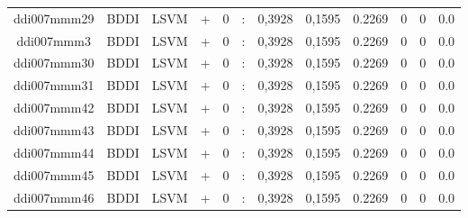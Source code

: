 \documentclass[a4paper]{article}
\begin{document}
\begin{landscape}
\begin{center}
\begin{tabular}{ |c|c|c|c|c|c|c|c|c|c|c|c|}
 	
 
 	
 		
 		\small{ ddi007mmm29 } & BDDI & LSVM & +  &  0 &  :  &  0,3928 & 0,1595 & 0.2269  &  0 & 0 & 0.0 \\
 		

 	
 
 	
 		
 		\small{ ddi007mmm3 } & BDDI & LSVM & +  &  0 &  :  &  0,3928 & 0,1595 & 0.2269  &  0 & 0 & 0.0 \\
 		

 	
 
 	
 		
 		\small{ ddi007mmm30 } & BDDI & LSVM & +  &  0 &  :  &  0,3928 & 0,1595 & 0.2269  &  0 & 0 & 0.0 \\
 		

 	
 
 	
 		
 		\small{ ddi007mmm31 } & BDDI & LSVM & +  &  0 &  :  &  0,3928 & 0,1595 & 0.2269  &  0 & 0 & 0.0 \\
 		

 	
 
 	
 		
 		\small{ ddi007mmm42 } & BDDI & LSVM & +  &  0 &  :  &  0,3928 & 0,1595 & 0.2269  &  0 & 0 & 0.0 \\
 		

 	
 
 	
 		
 		\small{ ddi007mmm43 } & BDDI & LSVM & +  &  0 &  :  &  0,3928 & 0,1595 & 0.2269  &  0 & 0 & 0.0 \\
 		

 	
 
 	
 		
 		\small{ ddi007mmm44 } & BDDI & LSVM & +  &  0 &  :  &  0,3928 & 0,1595 & 0.2269  &  0 & 0 & 0.0 \\
 		

 	
 
 	
 		
 		\small{ ddi007mmm45 } & BDDI & LSVM & +  &  0 &  :  &  0,3928 & 0,1595 & 0.2269  &  0 & 0 & 0.0 \\
 		

 	
 
 	
 		
 		\small{ ddi007mmm46 } & BDDI & LSVM & +  &  0 &  :  &  0,3928 & 0,1595 & 0.2269  &  0 & 0 & 0.0 \\
 		
 \hline
\end{tabular}
\end{center}





\end{landscape}
\end{document}
